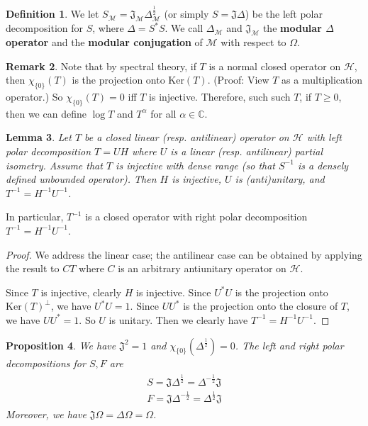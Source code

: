 \documentclass[12pt,b5paper,notitlepage]{article}
\theoremstyle{definition}
\newtheorem{df}{Definition}[section]
\newtheorem{rem}[df]{Remark}
\theoremstyle{plain}
\newtheorem{pp}[df]{Proposition}
\newtheorem{lm}[df]{Lemma}
\newcommand{\fk}{\mathfrak}
\newcommand{\mc}{\mathcal}
\newcommand{\Cbb}{\mathbb C}
\newcommand{\Ker}{\mathrm{Ker}}
\numberwithin{equation}{section}
\begin{document}
\subsection{}


\begin{df}
We let $S_{\mc M}=\fk J_{\mc M}\Delta_{\mc M}^{\frac 12}$ (or simply $S=\fk J\Delta$) be the left polar decomposition for $S$, where $\Delta=S^*S$. We call $\Delta_{\mc M}$ and $\fk J_{\mc M}$ the \textbf{modular $\Delta$ operator}  and the \textbf{modular conjugation}  of $\mc M$ with respect to $\Omega$. 
\end{df}


\begin{rem}
Note that by spectral theory, if $T$ is a normal closed operator on $\mc H$, then $\chi_{\{0\}}(T)$ is the projection onto $\Ker(T)$. (Proof: View $T$ as a multiplication operator.) So $\chi_{\{0\}}(T)=0$ iff $T$ is injective. Therefore, such such $T$, if $T\geq0$, then we can define $\log T$ and $T^\alpha$ for all $\alpha\in\Cbb$.
\end{rem}


\begin{lm}\label{lb94}
Let $T$ be a closed linear (resp. antilinear) operator on $\mc H$ with left polar decomposition $T=UH$ where $U$ is a linear (resp. antilinear) partial isometry. Assume that $T$ is injective with dense range (so that $S^{-1}$ is a densely defined unbounded operator). Then $H$ is injective, $U$ is (anti)unitary, and $T^{-1}=H^{-1}U^{-1}$.
\end{lm}

In particular, $T^{-1}$ is a closed operator with right polar decomposition $T^{-1}=H^{-1}U^{-1}$.


\begin{proof}
We address the linear case; the antilinear case can be obtained by applying the result to $CT$ where $C$ is an arbitrary antiunitary operator on $\mc H$.  

Since $T$ is injective, clearly $H$ is injective. Since $U^*U$ is the projection onto $\Ker(T)^\perp$, we have $U^*U=1$. Since $UU^*$ is the projection onto the closure of $T$, we have $UU^*=1$. So $U$ is unitary.  Then we clearly have $T^{-1}=H^{-1}U^{-1}$. 
\end{proof}



\begin{pp}
We have $\fk J^2=1$ and $\chi_{\{0\}}(\Delta^{\frac 12})=0$. The left and right polar decompositions for $S,F$ are
\begin{gather}\label{eq125}
\begin{gathered}
S=\fk J\Delta^{\frac 12}=\Delta^{-\frac 12}\fk J\\
F=\fk J\Delta^{-\frac 12}=\Delta^{\frac 12}\fk J
\end{gathered}
\end{gather}
Moreover, we have $\fk J\Omega=\Delta\Omega=\Omega$.
\end{pp}
\end{document}
